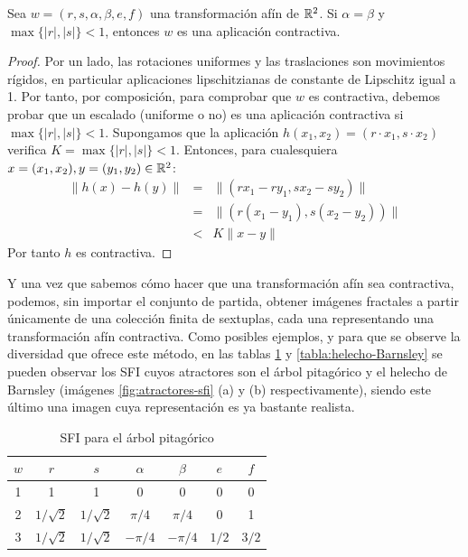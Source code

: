 \begin{proposicion}
    Sea $w =(r,s,\alpha,\beta,e,f)$ una transformación afín de $\mathbb{R}^2$. Si $\alpha=\beta$ y $\max\{|r|,|s|\}< 1$, entonces $w$ es una aplicación contractiva. 
\end{proposicion}
\begin{proof}
    Por un lado, las rotaciones uniformes y las traslaciones son movimientos rígidos, en particular aplicaciones lipschitzianas de constante de Lipschitz igual a 1. Por tanto, por composición, para comprobar que $w$ es contractiva, debemos probar que un escalado (uniforme o no) es una aplicación contractiva si $\max\{|r|,|s|\}<1$. Supongamos que la aplicación $h(x_1,x_2)=(r\cdot x_1,s\cdot x_2)$ verifica $K=\max\{|r|,|s|\}< 1$. Entonces, para cualesquiera $x=(x_1,x_2), y=(y_1,y_2)\in\mathbb{R}^2$:
    \begin{eqnarray*}
        \|h(x) - h(y)\| & = & \|(r x_1-r y_1, s x_2 - s y_2)\| \\
                        & = & \|(r(x_1-y_1), s(x_2-y_2))\| \\
                        & < & K \|x-y\|
    \end{eqnarray*}
    Por tanto $h$ es contractiva.
\end{proof}

Y una vez que sabemos cómo hacer que una transformación afín sea contractiva, podemos, sin importar el conjunto de partida, obtener imágenes fractales a partir únicamente de una colección finita de sextuplas, cada una representando una transformación afín contractiva. Como posibles ejemplos, y para que se observe la diversidad que ofrece este método, en las tablas \ref{tabla:arbol-pitagoras} y \ref{tabla:helecho-Barnsley} se pueden observar los SFI cuyos atractores son el árbol pitagórico y el helecho de Barnsley (imágenes \ref{fig:atractores-sfi} (a) y (b) respectivamente), siendo este último una imagen cuya representación es ya bastante realista.

\begin{table}
    \centering
    \begin{tabular}{c|cccccc} \hline
        $w$ & $r$ & $s$ & $\alpha$ & $\beta$ & $e$ & $f$ \\ \hline\hline
    1 & 1 & 1 & 0 & 0 & 0 & 0 \\ \hline
    2 & $1/\sqrt 2$ & $1/\sqrt 2$ & $\pi/4$ & $\pi/4$ & 0 & 1 \\ \hline
    3 & $1/\sqrt 2$ & $1/\sqrt 2$ & $-\pi/4$ & $-\pi/4$ & $1/2$ &  $3/2$ \\ \hline
    \end{tabular}
    \caption{SFI para el árbol pitagórico}
    \label{tabla:arbol-pitagoras}
\end{table}

